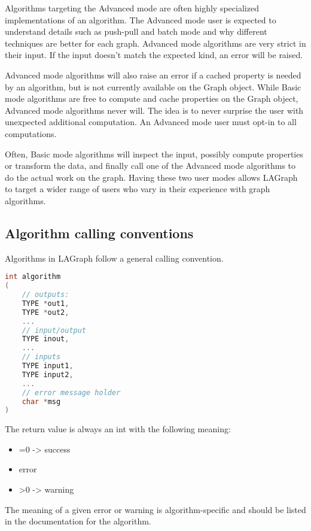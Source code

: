 Algorithms targeting the Advanced mode are often highly specialized implementations of an algorithm. The Advanced
mode user is expected to understand details such as push-pull and batch mode and why different techniques are
better for each graph. Advanced mode algorithms are very strict in their input. If the input doesn't match the
expected kind, an error will be raised.

Advanced mode algorithms will also raise an error if a cached property is needed by an algorithm, but is not
currently available on the Graph object. While Basic mode algorithms are free to compute and cache properties
on the Graph object, Advanced mode algorithms never will. The idea is to never surprise the user with unexpected
additional computation. An Advanced mode user must opt-in to all computations.

Often, Basic mode algorithms will inspect the input, possibly compute properties or transform the data,
and finally call one of the Advanced mode algorithms to do the actual work on the graph. Having these two user
modes allows LAGraph to target a wider range of users who vary in their experience with graph algorithms.


\subsection{Algorithm calling conventions}

Algorithms in LAGraph follow a general calling convention.

\begin{lstlisting}[language=C, label=lst:algorithmcallingconvention, caption=Calling convention in LAGraph]
int algorithm
(
    // outputs:
    TYPE *out1,
    TYPE *out2,
    ...
    // input/output
    TYPE inout,
    ...
    // inputs
    TYPE input1,
    TYPE input2,
    ...
    // error message holder
    char *msg
)
\end{lstlisting}

The return value is always an int with the following meaning:

\begin{itemize}
    \item =0 -> success
    \item <0 -> error
    \item >0 -> warning
\end{itemize}

The meaning of a given error or warning is algorithm-specific
and should be listed in the documentation for the algorithm.

